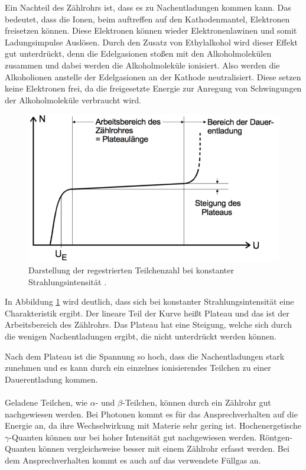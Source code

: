 Ein Nachteil des Zählrohrs ist, dass es zu Nachentladungen kommen kann. Das bedeutet,
dass die Ionen, beim auftreffen auf den Kathodenmantel, Elektronen freisetzen können.
Diese Elektronen können wieder Elektronenlawinen und somit Ladungsimpulse Auslösen.
Durch den Zusatz von Ethylalkohol wird dieser Effekt gut unterdrückt, denn die
Edelgasionen stoßen mit den Alkoholmolekülen zusammen und dabei werden die Alkoholmoleküle
ionisiert. Also werden die Alkoholionen anstelle der Edelgasionen an der Kathode neutralisiert.
Diese setzen keine Elektronen frei, da die freigesetzte Energie zur Anregung von Schwingungen
der Alkoholmoleküle verbraucht wird.

\begin{figure}[H]
  \centering
  \includegraphics[width=\textwidth]{content/Plateau.png}
  \caption{Darstellung der regestrierten Teilchenzahl bei konstanter Strahlungsintensität
  \cite{1}.}
  \label{abb:4}
\end{figure}

In Abbildung \ref{abb:4} wird deutlich, dass sich bei konstanter Strahlungsintensität
eine Charakteristik ergibt. Der lineare Teil der Kurve heißt Plateau und das ist der
Arbeitsbereich des Zählrohrs. Das Plateau hat eine Steigung, welche sich durch die wenigen
Nachentladungen ergibt, die nicht unterdrückt werden können.

Nach dem Plateau ist die Spannung so hoch, dass die Nachentladungen stark zunehmen
und es kann durch ein einzelnes ionisierendes Teilchen zu einer Dauerentladung kommen.
\\\\

Geladene Teilchen, wie $\alpha$- und $\beta$-Teilchen, können durch ein Zählrohr
gut nachgewiesen werden. Bei Photonen kommt es für das Ansprechverhalten auf die
Energie an, da ihre Wechselwirkung mit Materie sehr gering ist. Hochenergetische
$\gamma$-Quanten können nur bei hoher Intensität gut nachgewiesen werden. Röntgen-Quanten
können vergleichsweise besser mit einem Zählrohr erfasst werden. Bei dem Ansprechverhalten
kommt es auch auf das verwendete Füllgas an.
